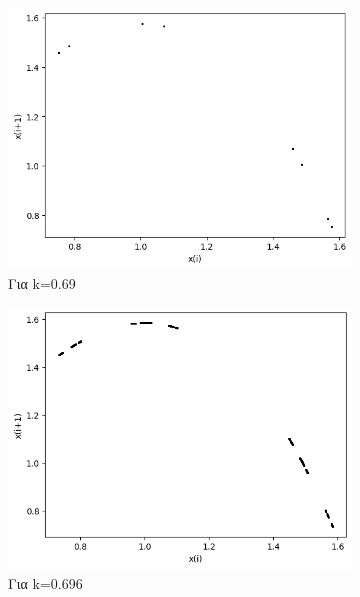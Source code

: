 \begin{figure}[h!]
\begin{subfigure}[b]{0.25\textwidth}
		\includegraphics[width=\textwidth]{LateX images/graphs q12/g7}
		\caption{Για k=0.69}
		\label{f:k63}
	\end{subfigure}
	\hfill
	\begin{subfigure}[b]{0.25\textwidth}
		\centering
		\includegraphics[width=\textwidth]{LateX images/graphs q12/g8}
		\caption{Για k=0.696}
		\label{f:k64}
	\end{subfigure}
	\hfill
	\begin{subfigure}[b]{0.25\textwidth}
		\centering

\end{subfigure}
\end{figure}
